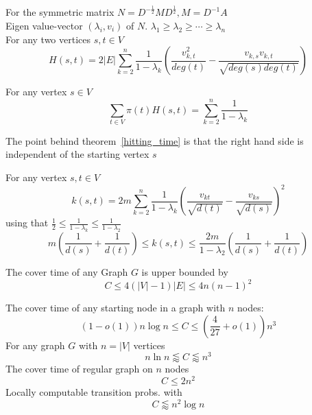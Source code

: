 \begin{theorem}
For the symmetric matrix $N=D^{-\frac{1}{2}}MD^{\frac{1}{2}}, M=D^{-1}A$\\
Eigen value-vector $(\lambda_i,v_i)$ of $N$. $\lambda_1\ge \lambda_2 \ge \cdots \ge \lambda_n$ \\
For any two vertices $s,t \in V$
\[
 H(s,t)=2|E|\sum_{k=2}^n\frac{1}{1-\lambda_k}(\frac{v_{k,t}^2}{deg(t)}-\frac{v_{k,s}v_{k,t}}{\sqrt{deg(s)deg(t)}})
\]
\end{theorem}

\begin{theorem}
\label{hitting_time}
For any vertex $s\in V$ 
\[
    \sum_{t\in V}\pi(t)H(s,t)=\sum_{k=2}^n\frac{1}{1-\lambda_k}
\]
\end{theorem}
The point behind theorem~\ref{hitting_time} is that the right hand side is independent of the starting vertex $s$

\begin{theorem}
\label{commute_time}
For any vertex $s,t \in V$
\[
k(s,t)=2m\sum_{k=2}^n\frac{1}{1-\lambda_k}(\frac{v_{kt}}{\sqrt{d(t)}}-\frac{v_{ks}}{\sqrt{d(s)}})^2
\]
using that $\frac{1}{2}\le \frac{1}{1-\lambda_k}\le \frac{1}{1-\lambda_2}$
\[
m(\frac{1}{d(s)}+\frac{1}{d(t)}) \le k(s,t) \le \frac{2m}{1-\lambda_2}(\frac{1}{d(s)}+\frac{1}{d(t)})
\]
\end{theorem}

\begin{theorem}
The cover time of any Graph $G$ is upper bounded by
\[
C\le 4(|V|-1)|E| \le 4n(n-1)^2
\]
\end{theorem}

\begin{theorem}
The cover time of any starting node in a graph with $n$ nodes:
\[
(1-o(1))n\log n \le C \le (\frac{4}{27}+o(1))n^3
\]
For any graph $G$ with $n=|V|$ vertices
\[
    n\ln n \lessapprox C \lessapprox n^3
\]
The cover time of regular graph on $n$ nodes 
\[
C\le 2n^2
\]
Locally computable transition probs. with
\[
    C\lessapprox n^2\log n
\]
\end{theorem}
